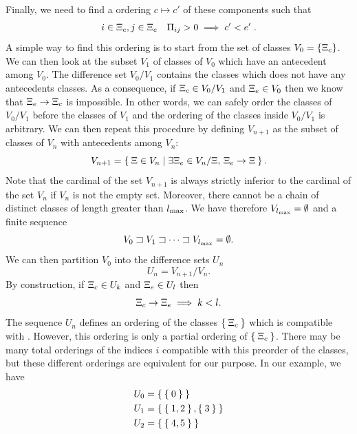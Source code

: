 \documentclass{article}
\begin{document}
Finally,  we need to find a ordering $c \mapsto c'$
of these components such that
\begin{equation} \label{eq:clOrder}
i \in \Xi_{c} , j \in \Xi_{e} \quad \Pi_{ij} > 0 \implies c' < e' \;.
\end{equation}
A simple way to find this ordering is to start from the set of classes $V_0=\{ \Xi_{c} \}$.
We can then look at the subset $V_1$ of classes of $V_0$ which have an antecedent among $V_0$.
The difference set $V_0/V_1$ contains the classes which does not have any antecedents classes.
As a consequence, if $\Xi_{c} \in V_0/V_1$ and $\Xi_{e} \in V_0$ then we know that $\Xi_{e} \rightarrow \Xi_{c}$ is impossible. In other words,
we can safely order the classes of $V_0/V_1$ before the classes of $V_1$ and the ordering of the classes
inside $V_0/V_1$ is arbitrary.  
We can then repeat this procedure by defining $V_{n+1}$ as the subset of classes of $V_n$ with
antecedents among $V_n$:
\begin{equation} \label{eq:app:sseq}
V_{n+1} = \Set{ \Xi  \in V_n | \exists \Xi _e \in V_n/\Xi,\,  \Xi _e \rightarrow  \Xi  }. 
\end{equation}
Note that the cardinal of the set $V_{n+1}$ is always strictly inferior to the cardinal of the set $V_n$
if $V_n$ is not the empty set. Moreover, there cannot be a chain of distinct classes of length greater 
than ${l_{\max}}$.  We have therefore $V_{l_{\max}}= \emptyset$ and a finite sequence 
\begin{equation}
V_0 \sqsupset V_1 \sqsupset \dots \sqsupset V_{l_{\max}} = \emptyset.  
\end{equation}
We can then partition $V_0$ into the difference sets $U_n$
\begin{equation}
  U_n = V_{n+1}/V_n.
\end{equation}
By construction, if $\Xi_{c} \in U_k$ and $\Xi_{e} \in U_l$ then 
\begin{equation}
  \label{eq:app:vseq:prop}
  \Xi_{c} \rightarrow \Xi_{e} \implies k < l.
\end{equation}
The sequence $U_n$ defines an ordering of the classes $\Set{\Xi_{c}}$ which is compatible with 
. However, this ordering is only a partial ordering of $\Set{\Xi_{c}}$.
There may be many total orderings of the indices $i$ compatible with this preorder of the classes, but these different 
orderings are equivalent for our purpose. In our example, we have
\begin{equation} \begin{aligned}
 U_{0} &= \Set{\Set{0}} \\  U_{1} &= \Set{\Set{1,2},\Set{3}} \\  U_{2} &= \Set{\Set{4,5}} \\ 
\end{aligned} \end{equation}
\end{document}
